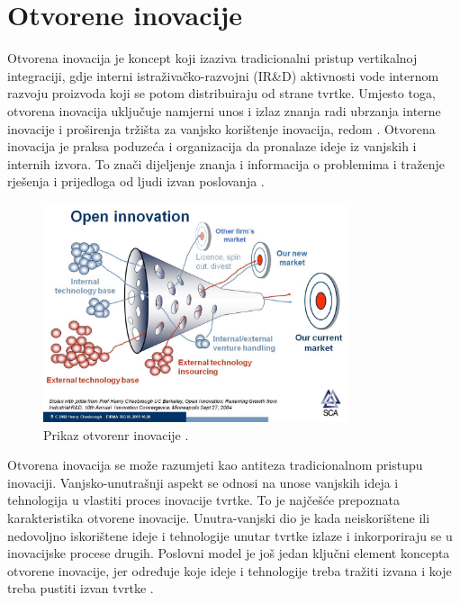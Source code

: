 \chapter{Otvorene inovacije} \label{ch:otvorene_inovacije}

Otvorena inovacija je koncept koji izaziva tradicionalni pristup vertikalnoj
integraciji, gdje interni istraživačko-razvojni (IR\&D) aktivnosti vode internom
razvoju proizvoda koji se potom distribuiraju od strane tvrtke. Umjesto toga,
otvorena inovacija uključuje namjerni unos i izlaz znanja radi ubrzanja interne
inovacije i proširenja tržišta za vanjsko korištenje inovacija, redom
\citep{forbesopeninnovation2011}. Otvorena inovacija je praksa poduzeća i
organizacija da pronalaze ideje iz vanjskih i internih izvora. To znači
dijeljenje znanja i informacija o problemima i traženje rješenja i prijedloga od
ljudi izvan poslovanja \citep{braineetopeninnovation2023}.

\begin{figure}
    \centering
    \includegraphics[width=0.8\textwidth]{images/open-innovation11}
    \caption{Prikaz otvorenr inovacije \citep{pakbecopeninnovation2013}.}
    \label{fig:open_innovation}
\end{figure}

Otvorena inovacija se može razumjeti kao antiteza tradicionalnom pristupu
inovaciji. Vanjsko-unutrašnji aspekt se odnosi na unose vanjskih ideja i
tehnologija u vlastiti proces inovacije tvrtke. To je najčešće prepoznata
karakteristika otvorene inovacije. Unutra-vanjski dio je kada neiskorištene ili
nedovoljno iskorištene ideje i tehnologije unutar tvrtke izlaze i inkorporiraju
se u inovacijske procese drugih. Poslovni model je još jedan ključni element
koncepta otvorene inovacije, jer određuje koje ideje i tehnologije treba tražiti
izvana i koje treba pustiti izvan tvrtke \citep{forbesopeninnovation2011}.

